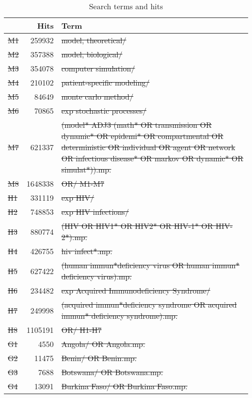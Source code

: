 \begingroup\footnotesize\singlespace
\begin{longtable}{lrp{}}
  \caption{Search terms and hits}
  \label{tab:ric.search} \\
  \toprule & Hits & Term \\ \midrule \endfirsthead
  \midrule \endhead \midrule \endfoot \bottomrule \endlastfoot
   \st{M1} &  \num{259932} & \st{model, theoretical/} \\
   \st{M2} &  \num{357388} & \st{model, biological/} \\
   \st{M3} &  \num{354078} & \st{computer simulation/} \\
   \st{M4} &  \num{210102} & \st{patient-specific modeling/} \\
   \st{M5} &   \num{84649} & \st{monte carlo method/} \\
   \st{M6} &   \num{70865} & \st{exp stochastic processes/} \\
   \st{M7} &  \num{621337} & \st{(model* ADJ3 (math* OR transmission OR dynamic* OR epidemi* OR compartmental OR deterministic OR individual OR agent OR network OR infectious disease* OR markov OR dynamic* OR simulat*)).mp.} \\
   \st{M8} & \num{1648338} & \st{OR/ M1-M7} \\
  \midrule
   \st{H1} &  \num{331119} & \st{exp HIV/} \\
   \st{H2} &  \num{748853} & \st{exp HIV infections/} \\
   \st{H3} &  \num{880774} & \st{(HIV OR HIV1* OR HIV2* OR HIV-1* OR HIV-2*).mp.} \\
   \st{H4} &  \num{426755} & \st{hiv infect*.mp.} \\
   \st{H5} &  \num{627422} & \st{(human immun*deficiency virus OR human immun* deficiency virus).mp.} \\
   \st{H6} &  \num{234482} & \st{exp Acquired Immunodeficiency Syndrome/} \\
   \st{H7} &  \num{249998} & \st{(acquired immun*deficiency syndrome OR acquired immun* deficiency syndrome).mp.} \\
   \st{H8} & \num{1105191} & \st{OR/ H1-H7} \\
  \midrule
   \st{G1} &    \num{4550} & \st{Angola/ OR Angola.mp.} \\
   \st{G2} &   \num{11475} & \st{Benin/ OR Benin.mp.} \\
   \st{G3} &    \num{7688} & \st{Botswana/ OR Botswana.mp.} \\
   \st{G4} &   \num{13091} & \st{Burkina Faso/ OR Burkina Faso.mp.} \\

\end{longtable}
